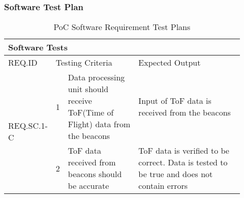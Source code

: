 \subsubsection{Software Test Plan}

\begin{table}[h!]
    \centering
    \begin{tabular}{|m{0.15\linewidth}|m{0.02\linewidth}|m{0.3\linewidth}|m{0.45\linewidth}|} 
    \hline
    \multicolumn{4}{|l|}{Software Tests }           \\ 
    \hline
    REQ.ID      & \multicolumn{2}{l|}{Testing Criteria}      & Expected Output          \\ 
    \hline
    \multirow{2}{*}{REQ.SC.1-C} & 1 
    & Data processing unit should receive ToF(Time of Flight) data from the beacons
    & Input of ToF data is received from the beacons        \\ 
    \cline{2-4}
    & 2 
    & ToF data received from beacons should be accurate  
    & ToF data is verified to be correct. Data is tested to be true and does not contain errors   \\
    \hline 
\end{tabular}
	\caption{PoC Software Requirement Test Plans}
\end{table}


